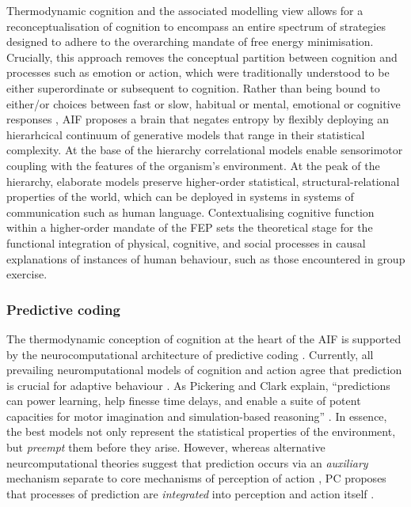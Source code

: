 \begin{CJK}{UTF8}{gbsn}
Thermodynamic cognition and the associated modelling view allows for a reconceptualisation of cognition to encompass an entire spectrum of strategies designed to adhere to the overarching mandate of free energy minimisation. Crucially, this approach removes the conceptual partition between cognition and processes such as emotion or action, which were traditionally understood to be either superordinate or subsequent to cognition.  Rather than being bound to either/or choices between fast or slow, habitual or mental, emotional or cognitive responses \citep[cf.][]{Kahneman2011}, AIF proposes a brain that negates entropy by flexibly deploying an hierarhcical continuum of generative models that range in their statistical complexity. At the base of the hierarchy correlational models enable sensorimotor coupling with the features of the organism's environment.  At the peak of the hierarchy, elaborate models preserve higher-order statistical, structural-relational properties of the world, which can be deployed in systems in systems of communication such as human language. Contextualising cognitive function within a higher-order mandate of the FEP sets the theoretical stage for the functional integration of physical, cognitive, and social processes in causal explanations of instances of human behaviour, such as those encountered in group exercise.

  \subsubsection{Predictive coding\label{sect:predictiveCoding}}
The thermodynamic conception of cognition at the heart of the AIF is supported by the neurocomputational architecture of predictive coding  \citep[hereafter PC, see][]{Rao1999,Clark2013}.  Currently, all prevailing neuromputational models of cognition and action agree that prediction is crucial for adaptive behaviour \citep{Wolpert2003,Clark2013}. As Pickering and Clark explain, ``predictions can power learning, help finesse time delays, and enable a suite of potent capacities for motor imagination and simulation-based reasoning'' \citep[6]{Pickering2014}.  In essence, the best models not only represent the statistical properties of the environment, but \textit{preempt} them before they arise.  However, whereas alternative neurcomputational theories suggest that prediction occurs via an \textit{auxiliary} mechanism separate to core mechanisms of perception of action \citep{Wolpert1997}, PC proposes that processes of prediction are \textit{integrated} into perception and action itself \citep[for a more detailed review of Auxiliary Forward Models and Integrative Forward Models, see Appendix ~\ref{app2:theory}, Section ~\ref{app2:motorControl};][]{Pickering2014}.


\end{CJK}

